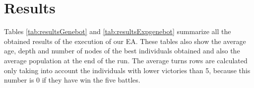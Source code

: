 {%

\section{Results}

Tables \ref{tab:resultsGenebot} and \ref{tab:resultsExpgenebot} summarize all the obtained results of the execution of our EA. These tables also show the average age, depth and number of nodes of the best individuals obtained and also the average population at the end of the run. The average turns rows are calculated only taking into account the individuals with lower victories than 5, because this number is 0 if they have win the five battles.

\newcommand{\SetRowColor}[1]{\noalign{\gdef\RowColorName{#1}}\rowcolor{\RowColorName}}
\newcommand{\mymulticolumn}[3]{\multicolumn{#1}{>{\columncolor{\RowColorName}}#2}{#3}}
\newcommand{\mymultirow}[3]{\multirow{#1}{>{\rowcolor{\RowColorName}}#2}{#3}}

\begin{table}
\resizebox{11cm}{!}{

}
\end{table}}
